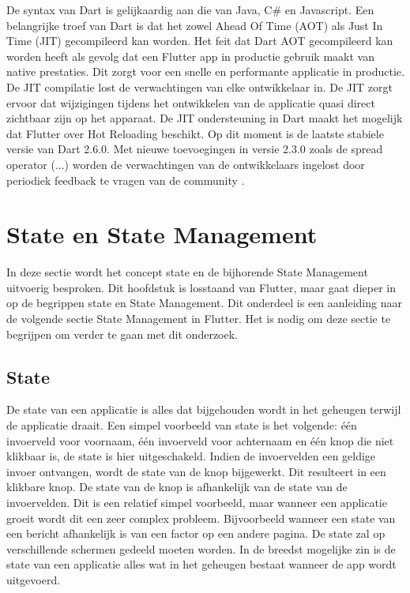 De syntax van Dart is gelijkaardig aan die van Java, C\# en Javascript.
Een belangrijke troef van Dart is dat het zowel Ahead Of Time (AOT) als Just In Time (JIT) gecompileerd kan worden. Het feit dat Dart AOT gecompileerd kan worden heeft als gevolg dat een Flutter app in productie gebruik maakt van native prestaties. Dit zorgt voor een snelle en performante applicatie in productie.
De JIT compilatie lost de verwachtingen van elke ontwikkelaar in. De JIT zorgt ervoor dat wijzigingen tijdens het ontwikkelen van de applicatie quasi direct zichtbaar zijn op het apparaat. De JIT ondersteuning in Dart maakt het mogelijk dat Flutter over Hot Reloading beschikt. \autocite{Leler2017a}
\newline
Op dit moment is de laatste stabiele versie van Dart 2.6.0. Met nieuwe toevoegingen in versie 2.3.0 zoals de spread operator (...) worden de verwachtingen van de ontwikkelaars ingelost door periodiek feedback te vragen van de community \autocite{Thomsen2019}.

\section{State en State Management}
In deze sectie wordt het concept state en de bijhorende State Management uitvoerig besproken. Dit hoofdstuk is losstaand van Flutter, maar gaat dieper in op de begrippen state en State Management. Dit onderdeel is een aanleiding naar de volgende sectie State Management in Flutter. Het is nodig om deze sectie te begrijpen om verder te gaan met dit onderzoek.

\subsection{State}
\label{ch:state}
De state van een applicatie is alles dat bijgehouden wordt in het geheugen terwijl de applicatie draait. \textcite{Coninck2019}
Een simpel voorbeeld van state is het volgende: één invoerveld voor voornaam, één invoerveld voor achternaam en één knop die niet klikbaar is, de state is hier uitgeschakeld. Indien de invoervelden een geldige invoer ontvangen, wordt de state van de knop bijgewerkt. Dit resulteert in een klikbare knop. De state van de knop is afhankelijk van de state van de invoervelden. Dit is een relatief simpel voorbeeld, maar wanneer een applicatie groeit wordt dit een zeer complex probleem. Bijvoorbeeld wanneer een state van een bericht afhankelijk is van een factor op een andere pagina. De state zal op verschillende schermen gedeeld moeten worden.
In de breedst mogelijke zin is de state van een applicatie alles wat in het geheugen bestaat wanneer de app wordt uitgevoerd. 

